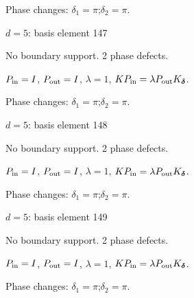\par\smallskip\begin{minipage}{.98\linewidth}\small Phase changes: $\delta_{1}=\pi$;\quad $\delta_{2}=\pi$.\end{minipage}
\vfill
{\footnotesize\texttt{}}
\newpage
{}
{\Large $d=5$: basis element 147}\par
No boundary support. 2 phase defects.
\begin{center}
\end{center}
\vspace{-1mm}
$P_{\rm in}=I$, \quad $P_{\rm out}=I$, \quad $\lambda=1$, \qquad $K P_{\rm in}=\lambda P_{\rm out}K_{\boldsymbol\delta}$.
\par\smallskip\begin{minipage}{.98\linewidth}\small Phase changes: $\delta_{1}=\pi$;\quad $\delta_{2}=\pi$.\end{minipage}
\vfill
{\footnotesize\texttt{}}
\newpage
{}
{\Large $d=5$: basis element 148}\par
No boundary support. 2 phase defects.
\begin{center}
\end{center}
\vspace{-1mm}
$P_{\rm in}=I$, \quad $P_{\rm out}=I$, \quad $\lambda=1$, \qquad $K P_{\rm in}=\lambda P_{\rm out}K_{\boldsymbol\delta}$.
\par\smallskip\begin{minipage}{.98\linewidth}\small Phase changes: $\delta_{1}=\pi$;\quad $\delta_{2}=\pi$.\end{minipage}
\vfill
{\footnotesize\texttt{}}
\newpage
{}
{\Large $d=5$: basis element 149}\par
No boundary support. 2 phase defects.
\begin{center}
\end{center}
\vspace{-1mm}
$P_{\rm in}=I$, \quad $P_{\rm out}=I$, \quad $\lambda=1$, \qquad $K P_{\rm in}=\lambda P_{\rm out}K_{\boldsymbol\delta}$.
\par\smallskip\begin{minipage}{.98\linewidth}\small Phase changes: $\delta_{1}=\pi$;\quad $\delta_{2}=\pi$.\end{minipage}
